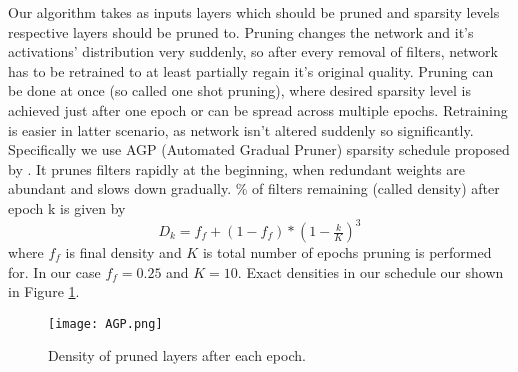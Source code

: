 \documentclass[../Main.tex]{subfiles}
\begin{document}
    Our algorithm takes as inputs layers which should be pruned and sparsity levels
    respective layers should be pruned to. Pruning changes the network and it's activations' distribution
    very suddenly, so after every removal of filters, network has to be retrained to 
    at least partially regain it's original quality. Pruning can be done at once 
    (so called one shot pruning), 
    where desired sparsity level is achieved just after one epoch or can be 
    spread across multiple epochs.  Retraining is easier in latter scenario,
    as network isn't altered suddenly so significantly. Specifically we use AGP (Automated
    Gradual Pruner) sparsity schedule proposed by \cite{zhu2017prune}. It prunes
    filters rapidly at the beginning, when redundant weights are abundant
    and slows down gradually. \% of filters remaining (called density) after epoch 
    k is given by
    \[ D_k = f_f + (1-f_f)*(1-\tfrac{k}{K})^3 \]
    where $f_f$ is final density and $K$ is total number of epochs
    pruning is performed for. In our case $f_f=0.25$ and $K=10$. Exact densities
    in our schedule our shown in Figure \ref{fig:AGP}. 
    
        \begin{figure}[h!]
            \texttt{[image: AGP.png]}
            \caption{Density of pruned layers after each epoch. 
            }
            \label{fig:AGP}
        \end{figure}
        

    
\end{document}
